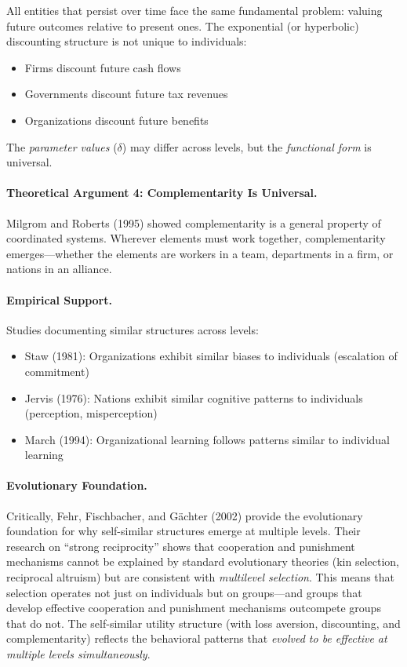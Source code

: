 \documentclass[12pt,a4paper]{article}
\begin{document}
All entities that persist over time face the same fundamental problem: 
valuing future outcomes relative to present ones. The exponential (or 
hyperbolic) discounting structure is not unique to individuals:
\begin{itemize}[nosep]
\item Firms discount future cash flows
\item Governments discount future tax revenues
\item Organizations discount future benefits
\end{itemize}

The \textit{parameter values} ($\delta$) may differ across levels, but the 
\textit{functional form} is universal.

\paragraph{Theoretical Argument 4: Complementarity Is Universal.}

Milgrom and Roberts (1995) showed complementarity is a general 
property of coordinated systems. Wherever elements must work together, 
complementarity emerges---whether the elements are workers in a team, 
departments in a firm, or nations in an alliance.

\paragraph{Empirical Support.}

Studies documenting similar structures across levels:
\begin{itemize}[nosep]
\item Staw (1981): Organizations exhibit similar biases to individuals 
(escalation of commitment)
\item Jervis (1976): Nations exhibit similar cognitive patterns to 
individuals (perception, misperception)
\item March (1994): Organizational learning follows patterns similar 
to individual learning
\end{itemize}

\paragraph{Evolutionary Foundation.}

Critically, Fehr, Fischbacher, and Gächter (2002) provide the evolutionary 
foundation for why self-similar structures emerge at multiple levels. Their 
research on ``strong reciprocity'' shows that cooperation and punishment 
mechanisms cannot be explained by standard evolutionary theories (kin selection, 
reciprocal altruism) but are consistent with \textit{multilevel selection}. 
This means that selection operates not just on individuals but on groups---and 
groups that develop effective cooperation and punishment mechanisms outcompete 
groups that do not. The self-similar utility structure (with loss aversion, 
discounting, and complementarity) reflects the behavioral patterns that 
\textit{evolved to be effective at multiple levels simultaneously}.
\end{document}
